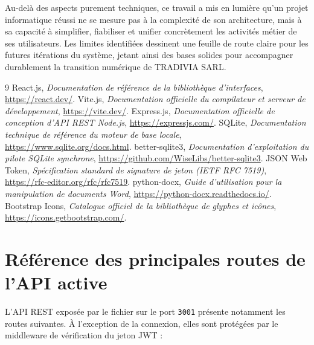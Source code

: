 \documentclass[12pt,a4paper,oneside]{report}
\newcommand{\Entreprise}{TRADIVIA SARL}
\newcommand{\code}[1]{\texttt{#1}}
\newcommand{\sourcefile}[1]{\path{#1}}
\begin{document}
Au-delà des aspects purement techniques, ce travail a mis en lumière qu'un projet informatique réussi ne se mesure pas à la complexité de son architecture, mais à sa capacité à simplifier, fiabiliser et unifier concrètement les activités métier de ses utilisateurs. Les limites identifiées dessinent une feuille de route claire pour les futures itérations du système, jetant ainsi des bases solides pour accompagner durablement la transition numérique de \Entreprise.

\renewcommand{\bibname}{Webographie}
\begin{thebibliography}{9}
 React.js, \emph{Documentation de référence de la bibliothèque d'interfaces}, \url{https://react.dev/}.
 Vite.js, \emph{Documentation officielle du compilateur et serveur de développement}, \url{https://vite.dev/}.
 Express.js, \emph{Documentation officielle de conception d'API REST Node.js}, \url{https://expressjs.com/}.
 SQLite, \emph{Documentation technique de référence du moteur de base locale}, \url{https://www.sqlite.org/docs.html}.
 better-sqlite3, \emph{Documentation d'exploitation du pilote SQLite synchrone}, \url{https://github.com/WiseLibs/better-sqlite3}.
 JSON Web Token, \emph{Spécification standard de signature de jeton (IETF RFC 7519)}, \url{https://rfc-editor.org/rfc/rfc7519}.
 python-docx, \emph{Guide d'utilisation pour la manipulation de documents Word}, \url{https://python-docx.readthedocs.io/}.
 Bootstrap Icons, \emph{Catalogue officiel de la bibliothèque de glyphes et icônes}, \url{https://icons.getbootstrap.com/}.
\end{thebibliography}

\appendix

\chapter{Référence des principales routes de l'API active}
L'API REST exposée par le fichier \sourcefile{apps/api/server.cjs} sur le port \code{3001} présente notamment les routes suivantes. À l'exception de la connexion, elles sont protégées par le middleware de vérification du jeton JWT :
\end{document}

